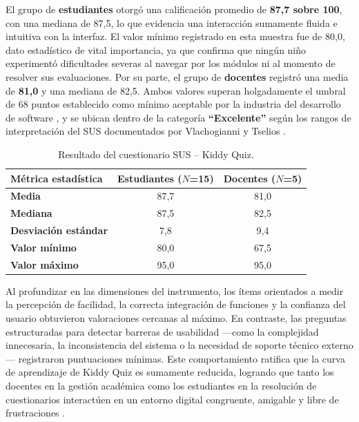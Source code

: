 El grupo de \textbf{estudiantes} otorgó una calificación promedio de \textbf{87,7 sobre 100}, con una mediana de 87,5, lo que evidencia una interacción sumamente fluida e intuitiva con la interfaz. El valor mínimo registrado en esta muestra fue de 80,0, dato estadístico de vital importancia, ya que confirma que ningún niño experimentó dificultades severas al navegar por los módulos ni al momento de resolver sus evaluaciones. Por su parte, el grupo de \textbf{docentes} registró
una media de \textbf{81,0} y una mediana de 82,5. Ambos valores superan
holgadamente el umbral de 68 puntos establecido como mínimo aceptable por la industria del desarrollo de software \cite{brooke1996sus}, y se ubican dentro de la categoría \textbf{``Excelente''} según los rangos de interpretación del SUS documentados por Vlachogianni y Tselios \cite{vlachogianni2022sus}.

\begin{table}[H]
\centering
\caption{Resultado del cuestionario SUS -- Kiddy Quiz.}
\label{tab:sus}
\footnotesize\renewcommand{\arraystretch}{1.25}
\begin{tabularx}{\textwidth}{|>{\bfseries}X|c|c|}
\hline\rowcolor{headblue}\textbf{Métrica estadística} & \textbf{Estudiantes ($N$=15)} & \textbf{Docentes ($N$=5)} \\\hline
Media               & 87,7 & 81,0 \\\hline
Mediana             & 87,5 & 82,5 \\\hline
Desviación estándar & 7,8  & 9,4  \\\hline
Valor mínimo        & 80,0 & 67,5 \\\hline
Valor máximo        & 95,0 & 95,0 \\\hline
\end{tabularx}
\end{table}
\fuenteautor

Al profundizar en las dimensiones del instrumento, los ítems orientados a medir la percepción de facilidad, la correcta integración de funciones y la confianza del usuario obtuvieron valoraciones cercanas al máximo. En contraste, las preguntas estructuradas para detectar barreras de usabilidad ---como la complejidad innecesaria, la inconsistencia del sistema o la necesidad de soporte técnico externo--- registraron puntuaciones mínimas. Este comportamiento ratifica que la curva de aprendizaje de Kiddy Quiz es sumamente reducida, logrando que tanto los
docentes en la gestión académica como los estudiantes en la resolución de
cuestionarios interactúen en un entorno digital congruente, amigable y libre de frustraciones \cite{vlachogianni2022sus,outhwaite2022apps}.

